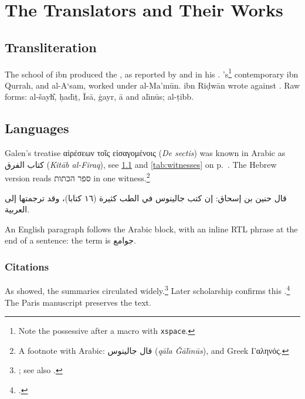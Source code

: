 \documentclass[../main.tex]{subfiles}
\begin{document}
\chapter{The Translators and Their Works}\label{chap:translators}

\section{Transliteration}\label{sec:translit}

The school of \hunayn ibn \ishaq produced the \jaw, as reported by
\usaybia and \qifti in his \qiftitarikh. \ishaq's\footnote{Note the
possessive after a macro with \texttt{xspace}.} contemporary \thabit
ibn Qurrah, and \hubaysh al-A`sam, worked under al-Ma'm\={u}n.
\ali ibn Ri\d{d}w\={a}n wrote against \dimashqi.
Raw forms: al-\v{s}ay\U{h}, \d{h}ad\={\i}\b{t}, \={I}s\={a}, \.{g}ayr,
\kha\={a}\thaa{} and \Jim al\={\i}n\=us; \Fi al-\d{t}ibb.

\section{Languages}\label{sec:languages}

Galen's treatise \textgreek{\Peri αἱρέσεων τοῖς εἰσαγομένοις} (\textit{De sectis})
was known in Arabic as \textarabic{كتاب الفرق} (\textit{Kit\={a}b al-Firaq}),
see \cref{sec:translit} and \cref{tab:witnesses} on p.~\pageref{tab:witnesses}.
The Hebrew version reads \texthebrew{ספר הכתות} in one witness.\footnote{A
footnote with Arabic: \textarabic{قال جالينوس} (\textit{q\={a}la
\v{G}\={a}l\={\i}n\=us}), and Greek \foreignlanguage{greek}{Γαληνός}.}

\begin{Arabic}
قال حنين بن إسحاق: إن كتب جالينوس في الطب كثيرة (١٦ كتابا)، وقد ترجمتها إلى العربية.
\end{Arabic}

An English paragraph follows the Arabic block, with an inline RTL phrase
at the end of a sentence: the term is \textarabic{جوامع}.

\subsection{Citations}

As \textcite{Ullmann1970} showed, the summaries circulated
widely.\footnote{\cite[59]{Ullmann1970}; see also
\cite[cf.][123--125]{SavageSmith2002}.} Later scholarship
\parencite[e.g.][12]{Koetschet2019} confirms this
\autocite{Pormann2026}.\footcite[\textarabic{ص}~٣٤]{Ibn-Abi-Usaybia}
The Paris manuscript \cite{MS-Paris-2860} preserves the text.
\end{document}

